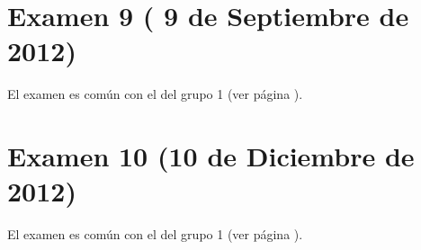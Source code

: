 \documentclass[a4paper,12pt,twoside]{book}
\begin{document}
\section{Examen 9 ( 9 de Septiembre de 2012)} 
El examen es común con el del grupo 1 (ver página \pageref{examen_11_12_1_9}).
\section{Examen 10 (10 de Diciembre de 2012)} 
El examen es común con el del grupo 1 (ver página \pageref{examen_11_12_1_10}).

\appendix %






\nocite{Alonso-12b}
\nocite{Bird-99a}
\nocite{Cunningham-10a}
\nocite{Daume-06}
\nocite{Davie-92a}
\nocite{Doets-04a}
\nocite{Fokker-96}
\nocite{Hudak-00a}
\nocite{Hudak-12a}
\nocite{Hutton-07a}
\nocite{OSullivan-08a}
\nocite{Rabhi-99a}
\nocite{Polya-65a}
\nocite{Ruiz-04}
\nocite{Thompson-11a}



\end{document}
